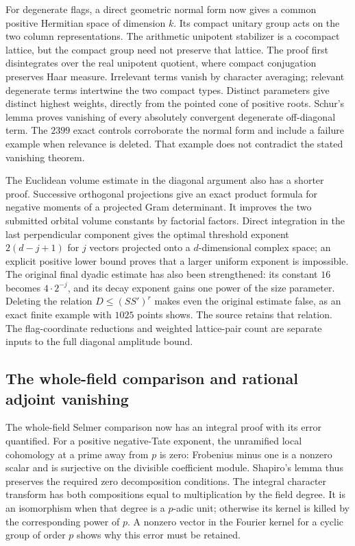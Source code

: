 \documentclass[11pt,a4paper]{article}
\theoremstyle{remark}
\begin{document}
For degenerate flags, a direct geometric normal form now gives a
common positive Hermitian space of dimension $k$. Its compact
unitary group acts on the two column representations. The arithmetic
unipotent stabilizer is a cocompact lattice, but the compact group
need not preserve that lattice. The proof first disintegrates over
the real unipotent quotient, where compact conjugation preserves
Haar measure. Irrelevant terms vanish by character averaging;
relevant degenerate terms intertwine the two compact types.
Distinct parameters give distinct highest weights, directly from
the pointed cone of positive roots. Schur's lemma proves vanishing
of every absolutely convergent degenerate off-diagonal term.
The $2399$ exact controls corroborate the normal form and include
a failure example when relevance is deleted. That example does
not contradict the stated vanishing theorem.

The Euclidean volume estimate in the diagonal argument also has
a shorter proof. Successive orthogonal projections give an exact
product formula for negative moments of a projected Gram determinant.
It improves the two submitted orbital volume constants by factorial
factors. Direct integration in the last perpendicular component
gives the optimal threshold exponent $2(d-j+1)$ for $j$ vectors
projected onto a $d$-dimensional complex space; an explicit positive
lower bound proves that a larger uniform exponent is impossible.
The original final dyadic estimate has also been strengthened:
its constant $16$ becomes $4\cdot2^{-j}$, and its decay exponent
gains one power of the size parameter. Deleting the relation
$D\le(SS')^r$ makes even the original estimate false, as an exact
finite example with $1025$ points shows. The source retains that
relation. The flag-coordinate reductions and weighted lattice-pair
count are separate inputs to the full diagonal amplitude bound.

\subsection{The whole-field comparison and rational adjoint vanishing}

The whole-field Selmer comparison now has an integral proof with
its error quantified. For a positive negative-Tate exponent, the
unramified local cohomology at a prime away from $p$ is zero:
Frobenius minus one is a nonzero scalar and is surjective on the
divisible coefficient module. Shapiro's lemma thus preserves the
required zero decomposition conditions. The integral character
transform has both compositions equal to multiplication by the
field degree. It is an isomorphism when that degree is a $p$-adic
unit; otherwise its kernel is killed by the corresponding power
of $p$. A nonzero vector in the Fourier kernel for a cyclic group
of order $p$ shows why this error must be retained.
\end{document}
